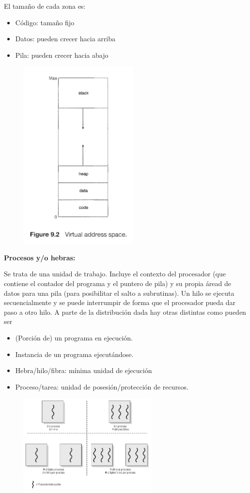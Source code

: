 \documentclass{article}
\begin{document}
El tamaño de cada zona es:
\begin{itemize}
\item Código: tamaño fijo

\item Datos: pueden crecer hacia arriba

\item Pila: pueden crecer hacia abajo
\end{itemize}

\begin{figure}[h]
\centering
\includegraphics[scale=1, width=60mm]{adresspace.png}
\end{figure}
\newpage
\textbf{Procesos y/o hebras:}

Se trata de una unidad de trabajo. Incluye el contexto del procesador (que contiene el contador del programa y el puntero de pila) y su propia áread de datos para una pila (para posibilitar el salto a subrutinas). Un hilo se ejecuta secuencialmente y se puede interrumpir de forma que el procesador pueda dar paso a otro hilo. A parte de la distribución dada hay otras distintas como pueden ser

\begin{itemize}
\item (Porción de) un programa en ejecución.

\item Instancia de un programa ejecutándose.

\item Hebra/hilo/fibra: mínima unidad de ejecución

\item Proceso/tarea: unidad de posesión/protección de recursos.
\end{itemize}
\begin{figure}[h]
\centering
\includegraphics[scale=1, width=70mm]{hilos_programa.png}
\end{figure}
\end{document}
